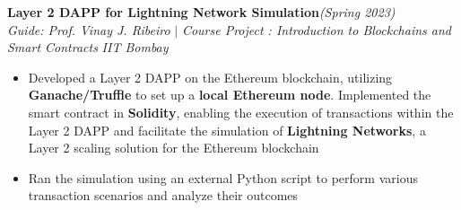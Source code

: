 \documentclass[a4paper,10pt]{article}
\begin{document}
\vspace{\baselineskip}
\vspace{-15pt}
\noindent\textbf{\large Layer 2 DAPP for Lightning Network Simulation}\hfill{\sl \small (Spring 2023)}\\
{\it Guide: Prof. Vinay J. Ribeiro} $|$ {\it Course Project : Introduction to Blockchains and Smart Contracts } \hfill{\it IIT Bombay}\\
\vspace{-15pt}
\begin{itemize}[itemsep = -0.65 mm, leftmargin=*]
    \item Developed a Layer 2 DAPP on the Ethereum blockchain, utilizing \textbf{Ganache/Truffle} to set up a \textbf{local Ethereum node}. Implemented the smart contract in \textbf{Solidity}, enabling the execution of transactions within the Layer 2 DAPP and facilitate the simulation of \textbf{Lightning Networks}, a Layer 2 scaling solution for the Ethereum blockchain
    \item Ran the simulation using an external Python script to perform various transaction scenarios and analyze their outcomes
\end{itemize}
\end{document}

